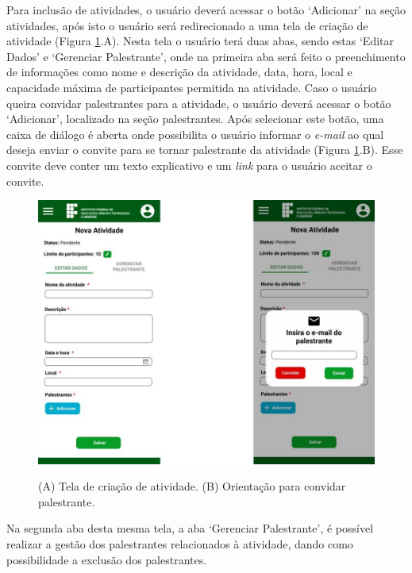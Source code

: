 Para inclusão de atividades, o usuário deverá acessar o botão ‘Adicionar’ na seção atividades, após isto o usuário será redirecionado a uma tela de criação de atividade (Figura \ref{fig:gestao9}.A). Nesta tela o usuário terá duas abas, sendo estas ‘Editar Dados’ e ‘Gerenciar Palestrante’, onde na primeira aba será feito o preenchimento de informações como nome e descrição da atividade, data, hora, local e capacidade máxima de participantes permitida na atividade. Caso o usuário queira convidar palestrantes para a atividade, o usuário deverá acessar o botão ‘Adicionar’, localizado na seção palestrantes. Após selecionar este botão, uma caixa de diálogo é aberta onde possibilita o usuário informar o \textit{e-mail} ao qual deseja enviar o convite para se tornar palestrante da atividade (Figura \ref{fig:gestao9}.B). Esse convite deve conter um texto explicativo e um \textit{link} para o usuário aceitar o convite.

\begin{figure}[H]
    \centering
    \caption{(A) Tela de criação de atividade. (B) Orientação para convidar palestrante.}
    \includegraphics[scale=0.63]{figuras/Gestao/9-10.jpg}
    \label{fig:gestao9}
\end{figure}

Na segunda aba desta mesma tela, a aba ‘Gerenciar Palestrante’, é possível realizar a gestão dos palestrantes relacionados à atividade, dando como possibilidade a exclusão dos palestrantes.

